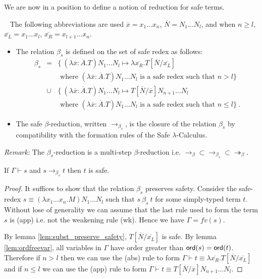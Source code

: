 \documentclass{llncs}
\newcommand\betared{\rightarrow_\beta}
\newcommand\betasred{\rightarrow_{\beta_s}}
\newcommand\betaredtr{\twoheadrightarrow_\beta} %
\newcommand\subst[2]{\left[ #1/#2 \right]}
\newcommand\ord[1]{{\sf ord}(#1)}
\begin{document}
We are now in a position to define a notion of reduction for safe terms.

\begin{definition} \
\label{dfn:safereduction} The following
abbreviations are used $\overline{x} = x_1 \ldots x_n$,
$\overline{N} = N_1 \ldots N_l$, and when $n\geq l$, $\overline{x_L}
= x_1 \ldots x_l$, $\overline{x_R} = x_{l+1} \ldots x_n$.
\begin{itemize}
\item The relation $\beta_s$ is defined on the set of safe redex as follows:
\begin{eqnarray*}
\beta_s &=&
\{  \ (\lambda \overline{x} : \overline{A} . T) N_1 \ldots N_l \mapsto \lambda \overline{x_R}. T\subst{\overline{N}}{\overline{x_L}}  \\
&& \mbox{ where $(\lambda \overline{x} : \overline{A} . T) N_1 \ldots N_l$ is a safe redex such that $n> l$}
\} \\
&\cup&
\{ \ (\lambda \overline{x} : \overline{A} . T) N_1 \ldots N_l \mapsto T\subst{\overline{N}}{\overline{x}} N_{n+1} \ldots N_l  \\
&& \mbox{ where $(\lambda \overline{x} : \overline{A} . T) N_1 \ldots N_l$ is a safe redex such that $n\leq l$}
\} \ .
\end{eqnarray*}

\item
The safe $\beta$-reduction, written $\betasred$, is the closure of
the relation $\beta_s$ by compatibility with the formation rules of
the Safe $\lambda$-Calculus.
\end{itemize}
\end{definition}

\noindent \emph{Remark:} The $\beta_s$-reduction is a multi-step $\beta$-reduction i.e. $\betared \subset \betasred \subset \betaredtr$.


\begin{lemma}
\label{lem:homoh_safered_preserve_safety}
If $\Gamma \vdash s$ and $s \betasred t$ then $t$ is safe.
\end{lemma}

\begin{proof}
It suffices to show that the relation $\beta_s$ preserves safety.
Consider the safe-redex $ s \equiv (\lambda x_1 \ldots x_n . M) N_1 \ldots N_l $ such that
$s\ \beta_s\ t$ for some simply-typed term $t$.
Without lose of generality we can assume that the last rule used to form the term $s$ is {\sf(app)} i.e. not the weakening rule
{\sf(wk)}. Hence we have $\Gamma = fv(s)$.

By lemma \ref{lem:subst_preserve_safety}, $T\subst{\overline{N}}{\overline{x_L}}$ is safe.
By lemma \ref{lem:ordfreevar}, all variables in $\Gamma$ have order greater than $\ord{s} = \ord{t}$. Therefore
if $n>l$ then we can use the {\sf(abs)} rule to form $\Gamma \vdash t \equiv \lambda \overline{x_R}. T\subst{\overline{N}}{\overline{x_L}}$
and if $n \leq l$ we can use the {\sf(app)} rule to form $\Gamma \vdash t \equiv  T\subst{\overline{N}}{\overline{x}} N_{n+1} \ldots N_l$.
\end{proof}
\end{document}
